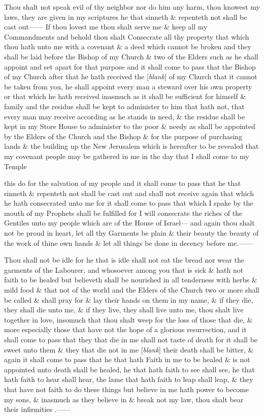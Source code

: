 			Thou shalt not speak evil of thy neighbor nor do him any harm, thou knowest my laws, they are given in my scriptures he that sinneth \& repenteth not shall be cast out------ If thou lovest me thou shalt serve me \& keep all my Commandments and behold thou shalt Consecrate all thy property that which thou hath unto me with a covenant \& a deed which cannot be broken and they shall be laid before the Bishop of my Church \& two of the Elders such as he shall appoint and set apart for that purpose and it shall come to pass that the Bishop of my Church after that he hath received the [\textit{blank}] of my Church that it cannot be taken from you, he shall appoint every man a steward over his own property or that which he hath received inasmuch as it shall be sufficient for himself \& family and the residue shall be kept to administer to him that hath not, that every man may receive according as he stands in need, \& the residue shall be kept in my Store House to administer to the poor \& needy as shall be appointed by the Elders of the Church and the Bishop \& for the purpose of purchasing lands \& the building up the New Jerusalem which is hereafter to be revealed that my covenant people may be gathered in me in the day that I shall come to my Temple

			this do for the salvation of my people and it shall come to pass that he that sinneth \& repenteth not shall be cast out and shall not receive again that which he hath consecrated unto me for it shall come to pass that which I spake by the mouth of my Prophets shall be fulfilled for I will consecrate the riches of the Gentiles unto my people which are of the House of Israel--- and again thou shalt not be proud in heart, let all thy Garments be plain \& their beauty the beauty of the work of thine own hands \& let all things be done in decency before me.------

			Thou shall not be idle for he that is idle shall not eat the bread nor wear the garments of the Labourer, and whosoever among you that is sick \& hath not faith to be healed but believeth shall be nourished in all tenderness with herbs \& mild food \& that not of the world and the Elders of the Church two or more shall be called \& shall pray for \& lay their hands on them in my name, \& if they die, they shall die unto me, \& if they live, they shall live unto me, thou shalt live together in love, insomuch that thou shalt weep for the loss of those that die, \& more especially those that have not the hope of a glorious resurrection, and it shall come to pass that they that die in me shall not taste of death for it shall be sweet unto them \& they that die not in me [\textit{blank}] their death shall be bitter, \& again it shall come to pass that he that hath Faith in me to be healed \& is not appointed unto death shall be healed, he that hath faith to see shall see, he that hath faith to hear shall hear, the lame that hath faith to leap shall leap, \& they that have not faith to do these things but believe in me hath power to become my sons, \& inasmuch as they believe in \& break not my law, thou shalt bear their infirmities .------

